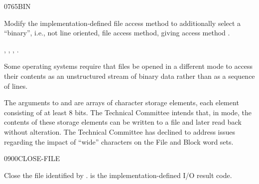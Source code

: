 \begin{worddef}{0765}{BIN}
\item {}

	Modify the implementation-defined file access method
	 to additionally select a ``binary'', i.e., not
	line oriented, file access method, giving access method
	.

\see {},
	,
	,
	.

	\begin{rationale} %
		Some operating systems require that files be opened in a
		different mode to access their contents as an unstructured
		stream of binary data rather than as a sequence of lines.

		The arguments to  and  are
		arrays of character storage elements, each element consisting
		of at least 8 bits. The Technical Committee intends that, in
		 mode, the contents of these storage elements can be
		written to a file and later read back without alteration. The
		Technical Committee has declined to address issues regarding
		the impact of ``wide'' characters on the File and Block word
		sets.
	\end{rationale}
\end{worddef}


\begin{worddef}{0900}{CLOSE-FILE}
\item {}

	Close the file identified by .  is the
	implementation-defined I/O result code.
\end{worddef}


